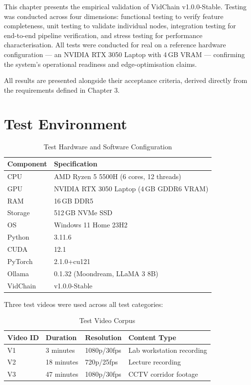 This chapter presents the empirical validation of VidChain v1.0.0-Stable. Testing was conducted across four dimensions: functional testing to verify feature completeness, unit testing to validate individual nodes, integration testing for end-to-end pipeline verification, and stress testing for performance characterisation. All tests were conducted for real on a reference hardware configuration --- an NVIDIA RTX 3050 Laptop with 4\,GB VRAM --- confirming the system's operational readiness and edge-optimisation claims.

All results are presented alongside their acceptance criteria, derived directly from the requirements defined in Chapter 3.


\section{Test Environment}

\begin{table}[H]
\centering
\small
\caption{Test Hardware and Software Configuration}
\label{tab:test_env}
\begin{tabular}{|p{4cm}|p{8cm}|}
\hline
\rowcolor[HTML]{EFEFEF}
\textbf{Component} & \textbf{Specification} \\ \hline
CPU & AMD Ryzen 5 5500H (6 cores, 12 threads) \\ \hline
GPU & NVIDIA RTX 3050 Laptop (4\,GB GDDR6 VRAM) \\ \hline
RAM & 16\,GB DDR5 \\ \hline
Storage & 512\,GB NVMe SSD \\ \hline
OS & Windows 11 Home 23H2 \\ \hline
Python & 3.11.6 \\ \hline
CUDA & 12.1 \\ \hline
PyTorch & 2.1.0+cu121 \\ \hline
Ollama & 0.1.32 (Moondream, LLaMA 3 8B) \\ \hline
VidChain & v1.0.0-Stable \\ \hline
\end{tabular}
\end{table}

Three test videos were used across all test categories:

\begin{table}[H]
\centering
\small
\caption{Test Video Corpus}
\label{tab:test_videos}
\begin{tabularx}{\textwidth}{|l|l|l|X|}
\hline
\rowcolor[HTML]{EFEFEF}
\textbf{Video ID} & \textbf{Duration} & \textbf{Resolution} & \textbf{Content Type} \\ \hline
V1 & 3 minutes & 1080p/30fps & Lab workstation recording \\ \hline
V2 & 18 minutes & 720p/25fps & Lecture recording \\ \hline
V3 & 47 minutes & 1080p/30fps & CCTV corridor footage \\ \hline
\end{tabularx}
\end{table}

